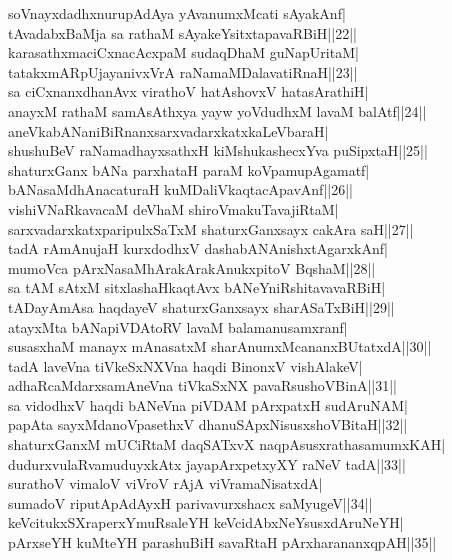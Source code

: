 \documentclass{article}
\begin{document}
soVnayxdadhxnurupAdAya yAvanumxMcati sAyakAnf|\\
tAvadabxBaMja sa rathaM sAyakeYsitxtapavaRBiH||22||\\
karasathxmaciCxnacAcxpaM sudaqDhaM guNapUritaM|\\
tatakxmARpUjayanivxVrA raNamaMDalavatiRnaH||23||\\
sa ciCxnanxdhanAvx virathoV hatAshovxV hatasArathiH|\\
anayxM rathaM samAsAthxya yayw yoVdudhxM lavaM balAtf||24||\\
aneVkabANaniBiRnanxsarxvadarxkatxkaLeVbaraH|\\
shushuBeV raNamadhayxsathxH kiMshukashecxYva puSipxtaH||25||\\
shaturxGanx bANa parxhataH paraM koVpamupAgamatf|\\
bANasaMdhAnacaturaH kuMDaliVkaqtacApavAnf||26||\\
vishiVNaRkavacaM deVhaM shiroVmakuTavajiRtaM|\\
sarxvadarxkatxparipulxSaTxM shaturxGanxsayx cakAra saH||27||\\
tadA rAmAnujaH kurxdodhxV dashabANAnishxtAgarxkAnf|\\
mumoVca pArxNasaMhArakArakAnukxpitoV BqshaM||28||\\
sa tAM sAtxM sitxlashaHkaqtAvx bANeYniRshitavavaRBiH|\\
tADayAmAsa haqdayeV shaturxGanxsayx sharASaTxBiH||29||\\
atayxMta bANapiVDAtoRV lavaM balamanusamxranf|\\
susasxhaM manayx mAnasatxM sharAnumxMcananxBUtatxdA||30||\\
tadA laveVna tiVkeSxNXVna haqdi BinonxV vishAlakeV|\\
adhaRcaMdarxsamAneVna tiVkaSxNX pavaRsushoVBinA||31||\\
sa vidodhxV haqdi bANeVna piVDAM pArxpatxH sudAruNAM|\\
papAta sayxMdanoVpasethxV dhanuSApxNisusxshoVBitaH||32||\\
shaturxGanxM mUCiRtaM daqSATxvX naqpAsusxrathasamumxKAH|\\
dudurxvulaRvamuduyxkAtx jayapArxpetxyXY raNeV tadA||33||\\
surathoV vimaloV viVroV rAjA viVramaNisatxdA|\\
sumadoV riputApAdAyxH parivavurxshacx saMyugeV||34||\\
keVcitukxSXraperxYmuRsaleYH keVcidAbxNeYsusxdAruNeYH|\\
pArxseYH kuMteYH parashuBiH savaRtaH pArxharananxqpAH||35||\\
\end{document}
